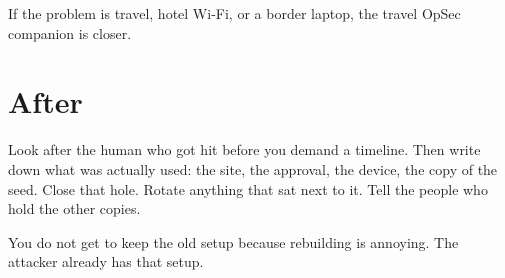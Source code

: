 If the problem is travel, hotel Wi-Fi, or a border
laptop, the travel OpSec companion is closer.

\section{After}

Look after the human who got hit before you demand a
timeline. Then write down what was actually used: the
site, the approval, the device, the copy of the seed.
Close that hole. Rotate anything that sat next to it.
Tell the people who hold the other copies.

You do not get to keep the old setup because rebuilding
is annoying. The attacker already has that setup.
